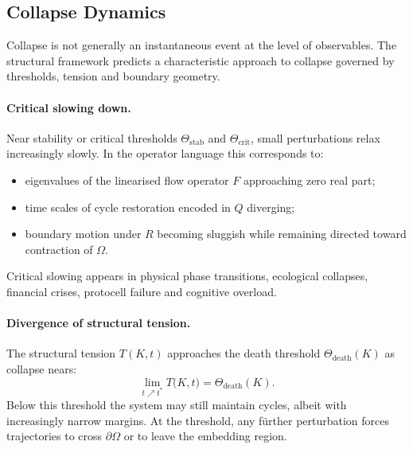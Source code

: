\subsection{Collapse Dynamics}

Collapse is not generally an instantaneous event at the level of observables.
The structural framework predicts a characteristic approach to collapse
governed by thresholds, tension and boundary geometry.

\paragraph{Critical slowing down.}
Near stability or critical thresholds \(\Theta_{\mathrm{stab}}\) and
\(\Theta_{\mathrm{crit}}\), small perturbations relax increasingly slowly.
In the operator language this corresponds to:
\begin{itemize}
  \item eigenvalues of the linearised flow operator \(F\) approaching zero
        real part;
  \item time scales of cycle restoration encoded in \(Q\) diverging;
  \item boundary motion under \(R\) becoming sluggish while remaining directed
        toward contraction of \(\Omega\).
\end{itemize}
Critical slowing appears in physical phase transitions, ecological collapses,
financial crises, protocell failure and cognitive overload.

\paragraph{Divergence of structural tension.}
The structural tension \(T(K,t)\) approaches the death threshold
\(\Theta_{\mathrm{death}}(K)\) as collapse nears:
\[
  \lim_{t\nearrow t^{\ast}} T\big(K,t\big)
    = \Theta_{\mathrm{death}}(K).
\]
Below this threshold the system may still maintain cycles, albeit with
increasingly narrow margins. At the threshold, any fürther perturbation
forces trajectories to cross \(\partial\Omega\) or to leave the embedding
region.

